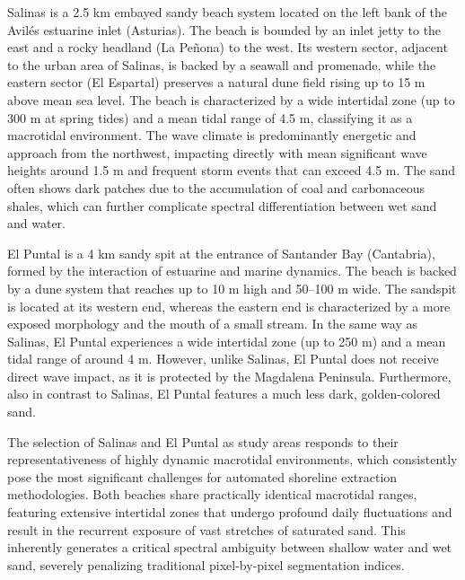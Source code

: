 ﻿\documentclass[ENG]{TFUOC}%
\begin{document}
Salinas is a 2.5 km embayed sandy beach system located on the left bank of the Avilés estuarine inlet (Asturias). The beach is bounded by an inlet jetty to the east and a rocky headland (La Peñona) to the west. Its western sector, adjacent to the urban area of Salinas, is backed by a seawall and promenade, while the eastern sector (El Espartal) preserves a natural dune field rising up to 15 m above mean sea level. The beach is characterized by a wide intertidal zone (up to 300 m at spring tides) and a mean tidal range of 4.5 m, classifying it as a macrotidal environment. The wave climate is predominantly energetic and approach from the northwest, impacting directly with mean significant wave heights around 1.5 m and frequent storm events that can exceed 4.5 m. The sand often shows dark patches due to the accumulation of coal and carbonaceous shales, which can further complicate spectral differentiation between wet sand and water.

El Puntal is a 4 km sandy spit at the entrance of Santander Bay (Cantabria), formed by the interaction of estuarine and marine dynamics. The beach is backed by a dune system that reaches up to 10 m high and 50–100 m wide. The sandspit is located at its western end, whereas the eastern end is characterized by a more exposed morphology and the mouth of a small stream. In the same way as Salinas, El Puntal experiences a wide intertidal zone (up to 250 m) and a mean tidal range of around 4 m. However, unlike Salinas, El Puntal does not receive direct wave impact, as it is protected by the Magdalena Peninsula. Furthermore, also in contrast to Salinas, El Puntal features a much less dark, golden-colored sand.

The selection of Salinas and El Puntal as study areas responds to their representativeness of highly dynamic macrotidal environments, which consistently pose the most significant challenges for automated shoreline extraction methodologies. Both beaches share practically identical macrotidal ranges, featuring extensive intertidal zones that undergo profound daily fluctuations and result in the recurrent exposure of vast stretches of saturated sand. This inherently generates a critical spectral ambiguity between shallow water and wet sand, severely penalizing traditional pixel-by-pixel segmentation indices.
\end{document}
